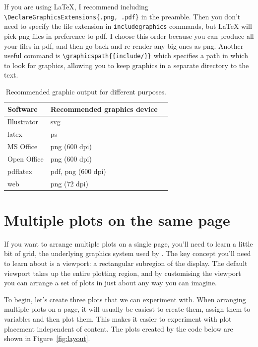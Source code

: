 If you are using \LaTeX, I recommend including \verb|\DeclareGraphicsExtensions{.png, .pdf}| in the preamble.  Then you don't need to specify the file extension in \verb|includegraphics| commands, but \LaTeX{} will pick png files in preference to pdf.  I choose this order because you can produce all your files in pdf, and then go back and re-render any big ones as png.  Another useful command is \verb|\graphicspath{{include/}}| which specifies a path in which to look for graphics, allowing you to keep graphics in a separate directory to the text.

\begin{table}
  \begin{center}
  \begin{tabular}{lll}
    \toprule
    Software & Recommended graphics device \\
    \midrule
    Illustrator & svg \\
    latex & ps \\
    MS Office & png (600 dpi) \\
    Open Office & png (600 dpi) \\
    pdflatex & pdf, png (600 dpi) \\
    web & png (72 dpi) \\
    \bottomrule 
  \end{tabular}
  \end{center}
  \caption{Recommended graphic output for different purposes.}
  \label{tbl:graphic-recommendation}
\end{table}

\section{Multiple plots on the same page}
\label{sec:grid-layout}

If you want to arrange multiple plots on a single page, you'll need to learn a little bit of grid, the underlying graphics system used by \ggplot. The key concept you'll need to learn about is a viewport: a rectangular subregion of the display. The default viewport takes up the entire plotting region, and by customising the viewport you can arrange a set of plots in just about any way you can imagine.  

To begin, let's create three plots that we can experiment with. When arranging multiple plots on a page, it will usually be easiest to create them, assign them to variables and then plot them. This makes it easier to experiment with plot placement independent of content. The plots created by the code below are shown in Figure~\ref{fig:layout}.

